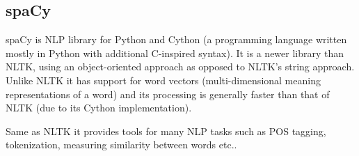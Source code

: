 \subsection{spaCy}
spaCy is NLP library for Python and Cython (a programming language written mostly in Python with additional C-inspired syntax). It is a newer library than NLTK, using an object-oriented approach as opposed to NLTK's string approach. Unlike NLTK  it has support for word vectors (multi-dimensional meaning representations of a word) and its processing is generally faster than that of NLTK (due to its Cython implementation). 

Same as NLTK it provides tools for many NLP tasks such as POS tagging, tokenization, measuring similarity between words etc..\cite{spacy}
